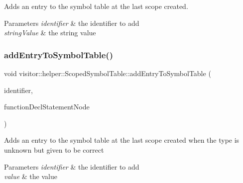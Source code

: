 Adds an entry to the symbol table at the last scope created. 
\begin{DoxyParams}{Parameters}
{\em identifier} & the identifier to add \\
\hline
{\em string\+Value} & the string value \\
\hline
\end{DoxyParams}
\mbox{\label{classvisitor_1_1helper_1_1ScopedSymbolTable_a7bd90ed126440e1110882ef00b8095ce}} 
\subsubsection{\texorpdfstring{add\+Entry\+To\+Symbol\+Table()}{addEntryToSymbolTable()}\hspace{0.1cm}{\footnotesize\ttfamily [6/7]}}
{\footnotesize\ttfamily void visitor\+::helper\+::\+Scoped\+Symbol\+Table\+::add\+Entry\+To\+Symbol\+Table (\begin{DoxyParamCaption}\item[{std\+::string}]{identifier,  }\item[{\hyperlink{classparser_1_1ast_1_1ASTFunctionDeclStatementNode}{parser\+::ast\+::\+A\+S\+T\+Function\+Decl\+Statement\+Node} $\ast$}]{function\+Decl\+Statement\+Node }\end{DoxyParamCaption})}

Adds an entry to the symbol table at the last scope created when the type is unknown but given to be correct 
\begin{DoxyParams}{Parameters}
{\em identifier} & the identifier to add \\
\hline
{\em value} & the value \\
\hline
\end{DoxyParams}
\mbox{\label{classvisitor_1_1helper_1_1ScopedSymbolTable_a7b1027f36d0682ea440d48230f7ec62a}} 
